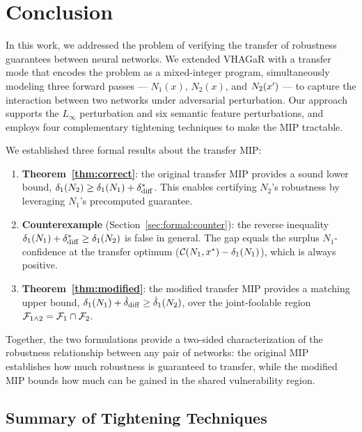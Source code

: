 \section{Conclusion}
\label{sec:conclusion}

In this work, we addressed the problem of verifying the transfer of robustness guarantees between neural networks. We extended VHAGaR with a transfer mode that encodes the problem as a mixed-integer program, simultaneously modeling three forward passes --- $N_1(x)$, $N_2(x)$, and $N_2(x')$ --- to capture the interaction between two networks under adversarial perturbation. Our approach supports the $L_\infty$ perturbation and six semantic feature perturbations, and employs four complementary tightening techniques to make the MIP tractable.

We established three formal results about the transfer MIP:
\begin{enumerate}
  \item \textbf{Theorem~\ref{thm:correct}}: the original transfer MIP provides a sound lower bound, $\delta_1(N_{2})\geq\delta_1(N_{1})+\delta_{\mathrm{diff}}^{*}$. This enables certifying $N_2$'s robustness by leveraging $N_1$'s precomputed guarantee.

  \item \textbf{Counterexample} (Section~\ref{sec:formal:counter}): the reverse inequality $\delta_1(N_{1})+\delta_{\mathrm{diff}}^{*}\geq\delta_1(N_{2})$ is false in general. The gap equals the surplus $N_1$-confidence at the transfer optimum ($\mathcal{C}(N_1,x^*) - \delta_1(N_{1})$), which is always positive.

  \item \textbf{Theorem~\ref{thm:modified}}: the modified transfer MIP provides a matching upper bound, $\delta_1(N_{1})+\hat{\delta}_{\mathrm{diff}}\geq\hat{\delta}_1(N_{2})$, over the joint-foolable region $\mathcal{F}_{1\wedge 2} = \mathcal{F}_{1} \cap \mathcal{F}_{2}$.
\end{enumerate}

Together, the two formulations provide a two-sided characterization of the robustness relationship between any pair of networks: the original MIP establishes how much robustness is guaranteed to transfer, while the modified MIP bounds how much can be gained in the shared vulnerability region.

\subsection{Summary of Tightening Techniques}

